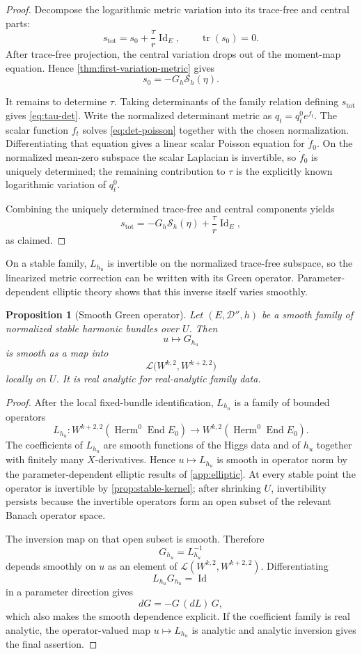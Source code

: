 \documentclass[11pt,reqno]{amsart}
\newtheorem{proposition}[theorem]{Proposition}
\theoremstyle{definition}
\theoremstyle{remark}
\newcommand{\cD}{\mathcal D}
\newcommand{\cS}{\mathcal S}
\newcommand{\End}{\operatorname{End}}
\newcommand{\Herm}{\operatorname{Herm}}
\newcommand{\Id}{\operatorname{Id}}
\newcommand{\tr}{\operatorname{tr}}
\begin{document}
\begin{proof}
Decompose the logarithmic metric variation into its trace-free and central parts:
\[
  s_{\mathrm{tot}}=s_0+\frac{\tau}{r}\Id_E,
  \qquad \tr(s_0)=0.
\]
After trace-free projection, the central variation drops out of the moment-map equation.  Hence \cref{thm:first-variation-metric} gives
\[
  s_0=-G_h\cS_h(\eta).
\]

It remains to determine $\tau$.  Taking determinants of the family relation defining $s_{\mathrm{tot}}$ gives \eqref{eq:tau-det}.  Write the normalized determinant metric as $q_t=q_t^0e^{f_t}$.  The scalar function $f_t$ solves \eqref{eq:det-poisson} together with the chosen normalization.  Differentiating that equation gives a linear scalar Poisson equation for $\dot f_0$.  On the normalized mean-zero subspace the scalar Laplacian is invertible, so $\dot f_0$ is uniquely determined; the remaining contribution to $\tau$ is the explicitly known logarithmic variation of $q_t^0$.

Combining the uniquely determined trace-free and central components yields
\[
  s_{\mathrm{tot}}
  =-G_h\cS_h(\eta)+\frac{\tau}{r}\Id_E,
\]
as claimed.
\end{proof}


On a stable family, $L_{h_u}$ is invertible on the normalized
trace-free subspace, so the linearized metric correction can be written
with its Green operator.  Parameter-dependent elliptic theory shows
that this inverse itself varies smoothly.

\begin{proposition}[Smooth Green operator]\label{prop:smooth-green}
Let $(E,\cD'',h)$ be a smooth family of normalized stable harmonic bundles over $U$.  Then
\[
  u\longmapsto G_{h_u}
\]
is smooth as a map into
\[
  \mathcal L\bigl(W^{k,2},W^{k+2,2}\bigr)
\]
locally on $U$.  It is real analytic for real-analytic family data.
\end{proposition}

\begin{proof}
After the local fixed-bundle identification, $L_{h_u}$ is a family of bounded operators
\[
  L_{h_u}:W^{k+2,2}(\Herm^0\End E_0)
  \longrightarrow W^{k,2}(\Herm^0\End E_0).
\]
The coefficients of $L_{h_u}$ are smooth functions of the Higgs data and of $h_u$ together with finitely many $X$-derivatives.  Hence $u\mapsto L_{h_u}$ is smooth in operator norm by the parameter-dependent elliptic results of \cref{app:elliptic}.  At every stable point the operator is invertible by \cref{prop:stable-kernel}; after shrinking $U$, invertibility persists because the invertible operators form an open subset of the relevant Banach operator space.

The inversion map on that open subset is smooth.  Therefore
\[
  G_{h_u}=L_{h_u}^{-1}
\]
depends smoothly on $u$ as an element of $\mathcal L(W^{k,2},W^{k+2,2})$.  Differentiating
\[
  L_{h_u}G_{h_u}=\Id
\]
in a parameter direction gives
\[
  dG=-G\,(dL)\,G,
\]
which also makes the smooth dependence explicit.  If the coefficient family is real analytic, the operator-valued map $u\mapsto L_{h_u}$ is analytic and analytic inversion gives the final assertion.
\end{proof}
\end{document}
